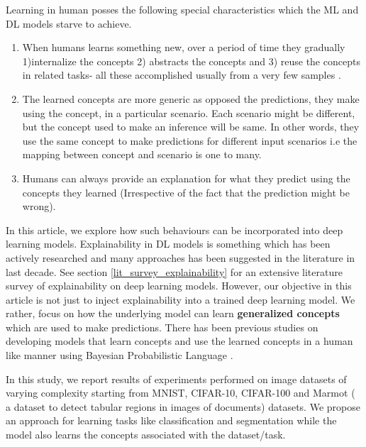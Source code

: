 \documentclass{JMLFS}
\begin{document}
Learning in human posses the following special characteristics which the ML and DL models starve to achieve.
\begin{enumerate}

\item When humans learns something new, over a period of time they gradually  1)internalize the concepts 2) abstracts the concepts and 3) reuse the concepts in related tasks- all these accomplished usually from a very few samples \cite{lake2015}.

\item The learned concepts are more generic as opposed the predictions, they make using the concept, in a particular scenario.
Each scenario might be different, but the concept used to make an inference will be same.
In other words, they use the same concept to make predictions for different input scenarios i.e the mapping between concept and scenario is one to many.

\item Humans can always provide an explanation for what they predict using the concepts they learned (Irrespective of the fact that the prediction might be wrong).

\end{enumerate}
In this article, we explore how such behaviours can be incorporated into deep learning models.
Explainability in DL models is something which has been actively researched and many approaches has been suggested in the literature in last decade\cite{linardatos2021}.
See section \ref{lit_survey_explainability} for an extensive literature survey of explainability on deep learning models.
However, our objective in this article is not just to inject explainability into a trained deep learning model.
We rather, focus on how the underlying model can learn \textbf{generalized concepts}  which are used to make predictions.
There has been previous studies \cite{lake2015} on developing models that learn concepts and use the learned concepts in a human like manner using Bayesian Probabilistic Language \cite{tenenbaum2019}.

In this study, we report results of experiments performed on image datasets of varying complexity starting from MNIST, CIFAR-10, CIFAR-100 and Marmot ( a dataset to detect tabular regions in images of documents) \cite{fang2012} datasets.
We propose an approach for learning tasks like classification and segmentation while the model also learns the concepts associated with the dataset/task.
\end{document}
